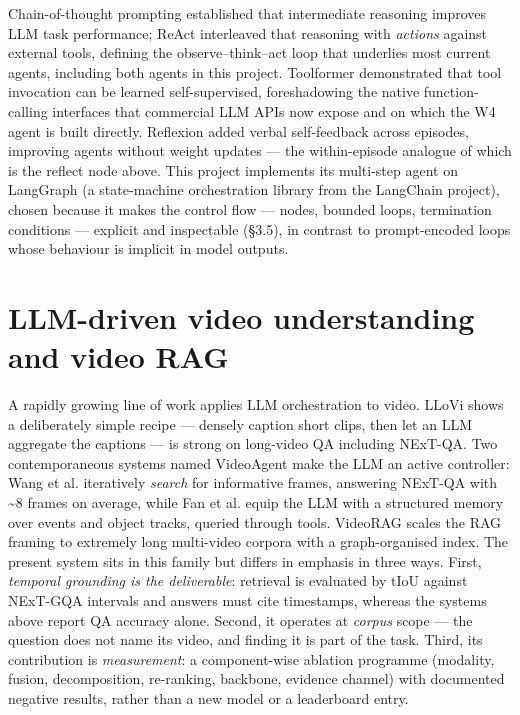 Chain-of-thought prompting \autocite{wei2022cot} established that
intermediate reasoning improves LLM task performance; ReAct
\autocite{yao2023react} interleaved that reasoning with \emph{actions}
against external tools, defining the observe--think--act loop that
underlies most current agents, including both agents in this project.
Toolformer \autocite{schick2023toolformer} demonstrated that tool
invocation can be learned self-supervised, foreshadowing the native
function-calling interfaces that commercial LLM APIs now expose and on
which the W4 agent is built directly. Reflexion
\autocite{shinn2023reflexion} added verbal self-feedback across
episodes, improving agents without weight updates --- the within-episode
analogue of which is the reflect node above. This project implements its
multi-step agent on LangGraph (a state-machine orchestration library
from the LangChain project), chosen because it makes the control flow
--- nodes, bounded loops, termination conditions --- explicit and
inspectable (§3.5), in contrast to prompt-encoded loops whose behaviour
is implicit in model outputs.

\section{LLM-driven video understanding and video
RAG}

A rapidly growing line of work applies LLM orchestration to video. LLoVi
\autocite{zhang2024llovi} shows a deliberately simple recipe --- densely
caption short clips, then let an LLM aggregate the captions --- is
strong on long-video QA including NExT-QA. Two contemporaneous systems
named VideoAgent make the LLM an active controller: Wang et al.
\autocite{wang2024videoagent} iteratively \emph{search} for informative
frames, answering NExT-QA with \textasciitilde8 frames on average, while
Fan et al. \autocite{fan2024videoagent} equip the LLM with a structured
memory over events and object tracks, queried through tools. VideoRAG
\autocite{ren2025videorag} scales the RAG framing to extremely long
multi-video corpora with a graph-organised index. The present system
sits in this family but differs in emphasis in three ways. First,
\emph{temporal grounding is the deliverable}: retrieval is evaluated by
tIoU against NExT-GQA intervals and answers must cite timestamps,
whereas the systems above report QA accuracy alone. Second, it operates
at \emph{corpus} scope --- the question does not name its video, and
finding it is part of the task. Third, its contribution is
\emph{measurement}: a component-wise ablation programme (modality,
fusion, decomposition, re-ranking, backbone, evidence channel) with
documented negative results, rather than a new model or a leaderboard
entry.

